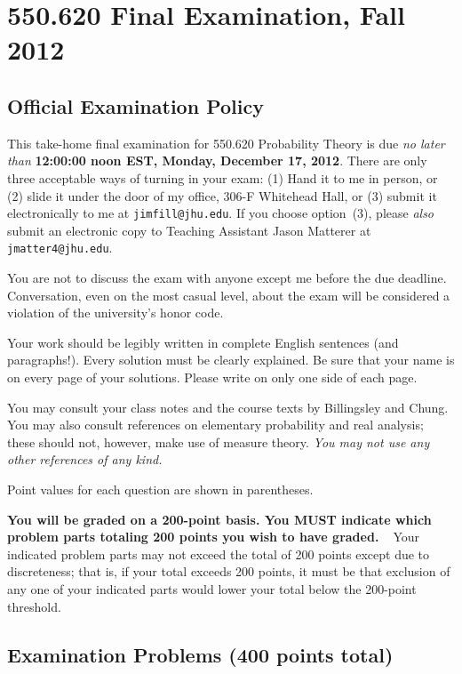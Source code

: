 \documentclass[letterpaper, 12pt]{article}
\begin{document}
\section*{550.620 Final Examination, Fall 2012}

\subsection*{Official Examination Policy}

\hspace{\parindent}
This take-home final examination for 550.620 Probability Theory is due {\em
no later than\/} {\bf 12:00:00 noon EST, Monday, December 17, 2012}.  There
are only three acceptable ways of turning in your exam: (1) Hand it to me in
person, or (2) slide it under the door of my office, 306-F Whitehead Hall, or
(3) submit it electronically to me at {\tt jimfill@jhu.edu}.  If you choose option~(3),
please \emph{also} submit an electronic copy to Teaching Assistant Jason Matterer at {\tt jmatter4@jhu.edu}. 

You are not to discuss the exam with anyone except me before 
the due deadline.  Conversation, even on the most casual level, about the exam
will be considered a violation of the university's honor code.

Your work should be legibly written in complete English sentences (and
paragraphs!).  Every solution must be clearly explained.  Be sure that your name
is on every page of your solutions.  Please write on only one side of each page.

You may consult your class notes and the course texts by Billingsley and Chung. 
You may also consult references on elementary probability and real analysis;
these should not, however, make use of measure theory.  {\em You may not use any
other references of any kind.\/}

Point values for each question are shown in parentheses.

{\bf You will be graded on a 200-point basis.  You MUST indicate which problem
parts totaling 200 points you wish to have graded.\ \ }Your indicated problem parts
may not exceed the total of 200 points except due to discreteness; that is, if your
total exceeds 200 points, it must be that exclusion of any one of your indicated
parts would lower your total below the 200-point threshold. 

\newpage

\subsection*{Examination Problems (400 points total)}
\end{document}
